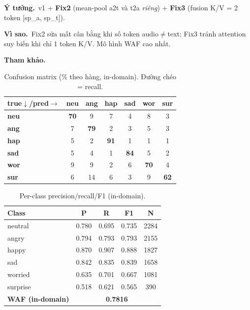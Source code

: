 \documentclass[10pt]{article}
\begin{document}
\textbf{Ý tưởng.}\ v1 + \textbf{Fix2} (mean-pool a2t và t2a \emph{riêng}) + \textbf{Fix3} (fusion K/V = 2 token [sp\_a, sp\_t]).

\textbf{Vì sao.}\ Fix2 sửa mất cân bằng khi số token audio$\neq$text; Fix3 tránh attention suy biến khi chỉ 1 token K/V. Mô hình WAF cao nhất.

\textbf{Tham khảo.}\ \cite{memocmt,vaswani2017}

\begin{table}[H]\centering\footnotesize\setlength{\tabcolsep}{4pt}
\begin{tabular}{lcccccc}
\toprule
\textbf{true$\downarrow$/pred$\rightarrow$} & \textbf{neu} & \textbf{ang} & \textbf{hap} & \textbf{sad} & \textbf{wor} & \textbf{sur} \\
\midrule
\textbf{neu} & \cellcolor{cmblue!49}\textbf{70} & \cellcolor{cmblue!6}9 & \cellcolor{cmblue!5}7 & \cellcolor{cmblue!3}4 & \cellcolor{cmblue!6}8 & \cellcolor{cmblue!2}3 \\
\textbf{ang} & \cellcolor{cmblue!5}7 & \cellcolor{cmblue!55}\textbf{79} & \cellcolor{cmblue!1}2 & \cellcolor{cmblue!2}3 & \cellcolor{cmblue!4}5 & \cellcolor{cmblue!2}3 \\
\textbf{hap} & \cellcolor{cmblue!3}5 & \cellcolor{cmblue!1}2 & \cellcolor{cmblue!63}\textbf{91} & \cellcolor{cmblue!0}1 & \cellcolor{cmblue!1}1 & \cellcolor{cmblue!1}1 \\
\textbf{sad} & \cellcolor{cmblue!4}5 & \cellcolor{cmblue!3}4 & \cellcolor{cmblue!1}1 & \cellcolor{cmblue!58}\textbf{84} & \cellcolor{cmblue!4}5 & \cellcolor{cmblue!1}2 \\
\textbf{wor} & \cellcolor{cmblue!6}9 & \cellcolor{cmblue!6}9 & \cellcolor{cmblue!1}2 & \cellcolor{cmblue!4}6 & \cellcolor{cmblue!49}\textbf{70} & \cellcolor{cmblue!3}4 \\
\textbf{sur} & \cellcolor{cmblue!4}6 & \cellcolor{cmblue!10}14 & \cellcolor{cmblue!4}6 & \cellcolor{cmblue!2}3 & \cellcolor{cmblue!6}9 & \cellcolor{cmblue!43}\textbf{62} \\
\bottomrule
\end{tabular}
\caption{Confusion matrix (\% theo hàng, in-domain). Đường chéo = recall.}
\end{table}

\begin{table}[H]\centering\footnotesize
\begin{tabular}{lcccc}
\toprule
\textbf{Class} & \textbf{P} & \textbf{R} & \textbf{F1} & \textbf{N} \\
\midrule
neutral & 0.780 & 0.695 & 0.735 & 2284 \\
angry & 0.794 & 0.793 & 0.793 & 2155 \\
happy & 0.870 & 0.907 & 0.888 & 1827 \\
sad & 0.842 & 0.835 & 0.839 & 1658 \\
worried & 0.635 & 0.701 & 0.667 & 1081 \\
surprise & 0.518 & 0.621 & 0.565 & 390 \\
\midrule
\textbf{WAF (in-domain)} & \multicolumn{4}{c}{\textbf{0.7816}} \\
\bottomrule
\end{tabular}
\caption{Per-class precision/recall/F1 (in-domain).}
\end{table}
\end{document}
